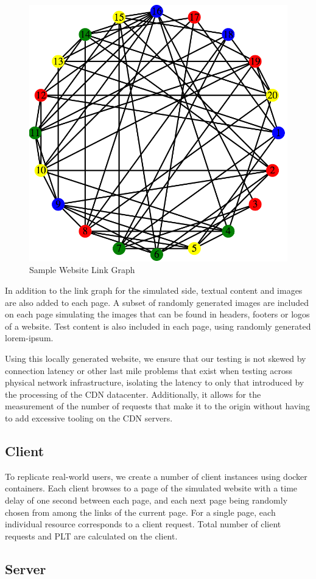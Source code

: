 \documentclass[conference]{IEEEtran}
\begin{document}
\begin{figure}[!h]
	\centering
	\includegraphics[width=0.49\columnwidth]{figures/web_graph}
	\caption{Sample Website Link Graph}\label{fig:web_graph}
\end{figure}

In addition to the link graph for the simulated side, textual content and images are also added to each page.  A subset of randomly generated images are included on each page simulating the  images that can be found in headers, footers or logos of a website.  Test content is also included in each page, using randomly generated lorem-ipsum.

Using this locally generated website, we ensure that our testing is not skewed by connection latency or other last mile problems that exist when testing across physical network infrastructure, isolating the latency to only that introduced by the processing of the CDN datacenter.  Additionally, it allows for the measurement of the number of requests that make it to the origin without having to add excessive tooling on the CDN servers.

\subsection*{Client}
To replicate real-world users, we create a number of client instances using docker containers. Each client browses to a page of the simulated website with a time delay of one second between each page, and each next page being randomly chosen from among the links of the current page. For a single page, each individual resource corresponds to a client request. Total number of client requests and PLT are calculated on the client. 
\subsection*{Server}
\end{document}
